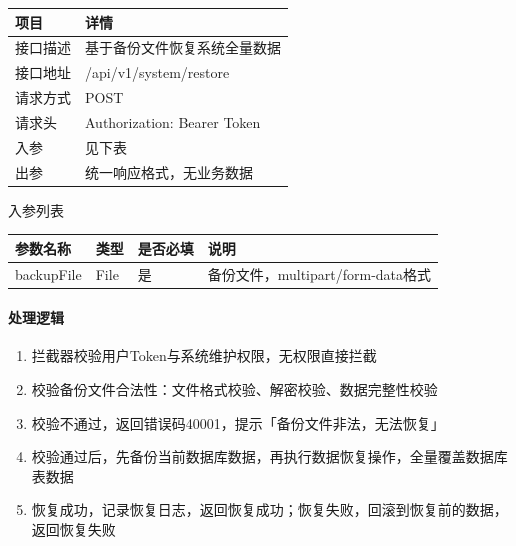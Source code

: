 \documentclass[12pt, a4paper]{article}
\begin{document}
\begin{table}[H]
    \centering
    \begin{tabular}{|l|l|}
        \hline
        项目 & 详情 \\
        \hline
        接口描述 & 基于备份文件恢复系统全量数据 \\
        \hline
        接口地址 & /api/v1/system/restore \\
        \hline
        请求方式 & POST \\
        \hline
        请求头 & Authorization: Bearer {Token} \\
        \hline
        入参 & 见下表 \\
        \hline
        出参 & 统一响应格式，无业务数据 \\
        \hline
    \end{tabular}
\end{table}

入参列表

\begin{table}[H]
    \centering
    \begin{tabular}{|l|l|l|l|}
        \hline
        参数名称 & 类型 & 是否必填 & 说明 \\
        \hline
        backupFile & File & 是 & 备份文件，multipart/form-data格式 \\
        \hline
    \end{tabular}
\end{table}

\paragraph{处理逻辑}
\begin{enumerate}
\item 拦截器校验用户Token与系统维护权限，无权限直接拦截

\item 校验备份文件合法性：文件格式校验、解密校验、数据完整性校验

\item 校验不通过，返回错误码40001，提示「备份文件非法，无法恢复」

\item 校验通过后，先备份当前数据库数据，再执行数据恢复操作，全量覆盖数据库表数据

\item 恢复成功，记录恢复日志，返回恢复成功；恢复失败，回滚到恢复前的数据，返回恢复失败
\end{enumerate}

\newpage
\end{document}
